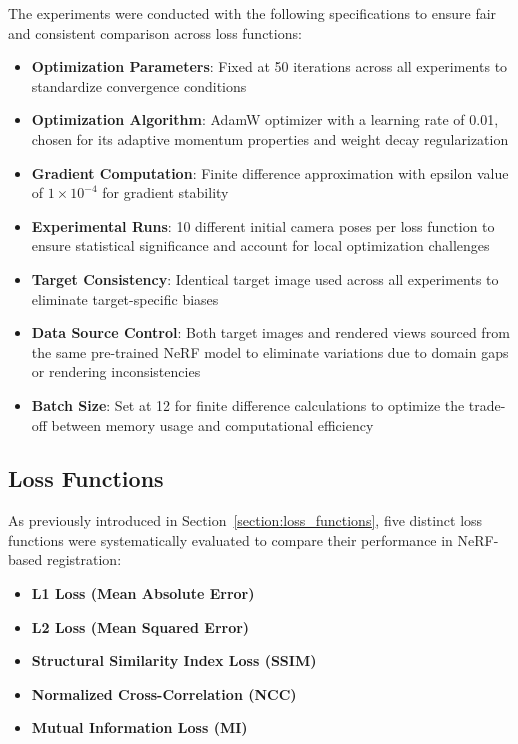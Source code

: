 The experiments were conducted with the following specifications to ensure fair and consistent comparison across loss functions:
\begin{itemize}
    \item \textbf{Optimization Parameters}: Fixed at 50 iterations across all experiments to standardize convergence conditions
    \item \textbf{Optimization Algorithm}: AdamW optimizer with a learning rate of 0.01, chosen for its adaptive momentum properties and weight decay regularization
    \item \textbf{Gradient Computation}: Finite difference approximation with epsilon value of $1 \times 10^{-4}$ for gradient stability
    \item \textbf{Experimental Runs}: 10 different initial camera poses per loss function to ensure statistical significance and account for local optimization challenges
    \item \textbf{Target Consistency}: Identical target image used across all experiments to eliminate target-specific biases
    \item \textbf{Data Source Control}: Both target images and rendered views sourced from the same pre-trained NeRF model to eliminate variations due to domain gaps or rendering inconsistencies
    \item \textbf{Batch Size}: Set at 12 for finite difference calculations to optimize the trade-off between memory usage and computational efficiency
\end{itemize}

\subsection{Loss Functions}

As previously introduced in Section~\ref{section:loss_functions}, five distinct loss functions were systematically evaluated to compare their performance in NeRF-based registration:

\begin{itemize}
    \item \textbf{L1 Loss (Mean Absolute Error)}
    
    \item \textbf{L2 Loss (Mean Squared Error)}
    
    \item \textbf{Structural Similarity Index Loss (SSIM)}
    
    \item \textbf{Normalized Cross-Correlation (NCC)}
    
    \item \textbf{Mutual Information Loss (MI)}
\end{itemize}

